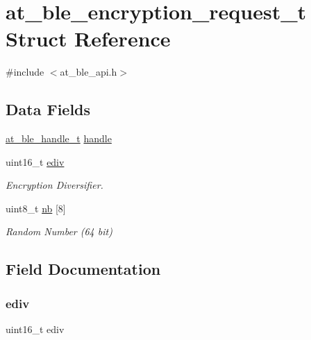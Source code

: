 \hypertarget{structat__ble__encryption__request__t}{}\section{at\+\_\+ble\+\_\+encryption\+\_\+request\+\_\+t Struct Reference}
\label{structat__ble__encryption__request__t}


{\ttfamily \#include $<$at\+\_\+ble\+\_\+api.\+h$>$}

\subsection*{Data Fields}
\begin{DoxyCompactItemize}
\item 
\mbox{\hyperlink{at__ble__api_8h_abd23646d0c662860741f787efc8456f2}{at\+\_\+ble\+\_\+handle\+\_\+t}} \mbox{\hyperlink{structat__ble__encryption__request__t_ab8b0f353cb6a8d85f0822900e3b7cf35}{handle}}
\item 
uint16\+\_\+t \mbox{\hyperlink{structat__ble__encryption__request__t_aced7ac80397d2549e5ecbb13de235936}{ediv}}
\begin{DoxyCompactList}\small\item\em Encryption Diversifier. \end{DoxyCompactList}\item 
uint8\+\_\+t \mbox{\hyperlink{structat__ble__encryption__request__t_a3199b838db07457933ad33b42b04de39}{nb}} \mbox{[}8\mbox{]}
\begin{DoxyCompactList}\small\item\em Random Number (64 bit) \end{DoxyCompactList}\end{DoxyCompactItemize}


\subsection{Field Documentation}
\mbox{\label{structat__ble__encryption__request__t_aced7ac80397d2549e5ecbb13de235936}} 
\subsubsection{\texorpdfstring{ediv}{ediv}}
{\footnotesize\ttfamily uint16\+\_\+t ediv}



